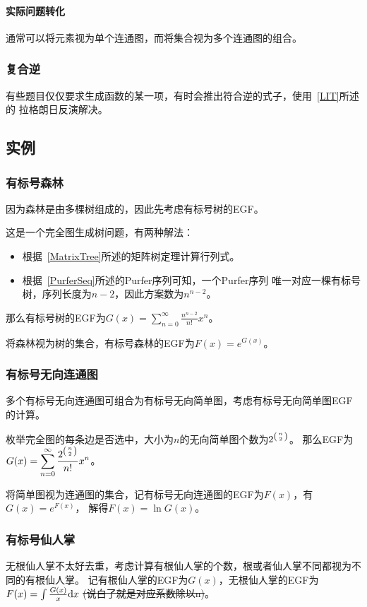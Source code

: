 \paragraph{实际问题转化}
通常可以将元素视为单个连通图，而将集合视为多个连通图的组合。
\subsubsection{复合逆}
有些题目仅仅要求生成函数的某一项，有时会推出符合逆的式子，使用~\ref{LIT}所述的
拉格朗日反演解决。
\subsection{实例}
\subsubsection{有标号森林}
因为森林是由多棵树组成的，因此先考虑有标号树的EGF。

这是一个完全图生成树问题，有两种解法：
\begin{itemize}
    \item 根据~\ref{MatrixTree}所述的矩阵树定理计算行列式。
    \item 根据~\ref{PurferSeq}所述的Purfer序列可知，一个Purfer序列
    唯一对应一棵有标号树，序列长度为$n-2$，因此方案数为$n^{n-2}$。
\end{itemize}

那么有标号树的EGF为$G(x)=\displaystyle \sum_{n=0}^\infty{\frac{n^{n-2}}{n!}x^n}$。

将森林视为树的集合，有标号森林的EGF为$F(x)=e^{G(x)}$。
\subsubsection{有标号无向连通图}
多个有标号无向连通图可组合为有标号无向简单图，考虑有标号无向简单图EGF的计算。

枚举完全图的每条边是否选中，大小为$n$的无向简单图个数为$2^{\left(n \atop 2\right)}$。
那么EGF为$G(x)=\displaystyle \sum_{n=0}^\infty{\frac{2^{\left(n \atop 2\right)}}{n!}x^n}$。

将简单图视为连通图的集合，记有标号无向连通图的EGF为$F(x)$，有$G(x)=e^{F(x)}$，
解得$F(x)=\ln G(x)$。
\subsubsection{有标号仙人掌}
无根仙人掌不太好去重，考虑计算有根仙人掌的个数，根或者仙人掌不同都视为不同的有根仙人掌。
记有根仙人掌的EGF为$G(x)$，无根仙人掌的EGF为$F(x)=\int \frac{G(x)}{x} \textrm{d} x$
\sout{(说白了就是对应系数除以n)}。

